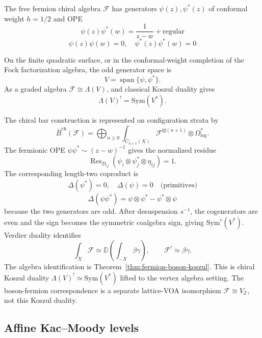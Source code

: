 \begin{example}\label{ex:fermions-NAP}
The free fermion chiral algebra $\mathcal{F}$ has generators
$\psi(z), \psi^*(z)$ of conformal weight $h=1/2$ and OPE
\[\psi(z) \psi^*(w) = \frac{1}{z-w} + \text{regular}\]
\[\psi(z) \psi(w) = 0, \quad \psi^*(z) \psi^*(w) = 0\]

On the finite quadratic surface, or in the conformal-weight
completion of the Fock factorization algebra, the odd generator space
is
\[
V=\operatorname{span}\{\psi,\psi^*\}.
\]
As a graded algebra $\mathcal{F}\cong\Lambda(V)$, and classical
Koszul duality gives
\[
\Lambda(V)^! = \mathrm{Sym}(V^*).
\]

The chiral bar construction is represented on configuration strata by
\[
\bar{B}^{\mathrm{ch}}(\mathcal{F})
=
\bigoplus_{n \geq 0}
\int_{\overline{C}_{n+1}(X)}
\mathcal{F}^{\boxtimes(n+1)}\otimes\Omega^*_{\log}.
\]
The fermionic OPE $\psi \psi^* \sim (z-w)^{-1}$ gives the normalized
residue
\[
\operatorname{Res}_{D_{ij}}
(\psi_i \otimes \psi^*_j \otimes \eta_{ij})=1.
\]
The corresponding length-two coproduct is
\[\Delta(\psi^*) = 0, \quad \Delta(\psi) = 0 \quad \text{(primitives)}\]
\[\Delta(\psi \psi^*) = \psi \otimes \psi^* - \psi^* \otimes \psi\]
because the two generators are odd. After desuspension $s^{-1}$, the
cogenerators are even and the sign becomes the symmetric coalgebra
sign, giving $\mathrm{Sym}^c(V^*)$. Verdier duality identifies
\[
\int_X \mathcal{F}
\simeq
\mathbb{D}\!\left(\int_{-X}\beta\gamma\right),
\qquad
\mathcal{F}^! \simeq \beta\gamma .
\]
The algebra identification is Theorem~\ref{thm:fermion-boson-koszul}.
This is chiral Koszul duality
$\Lambda(V)^! \simeq \mathrm{Sym}(V^*)$ lifted to the vertex algebra
setting. The boson-fermion correspondence is a separate lattice-VOA
isomorphism $\mathcal{F} \cong V_{\mathbb{Z}}$, not this Koszul
duality.
\end{example}

\subsection{Affine Kac--Moody levels}

